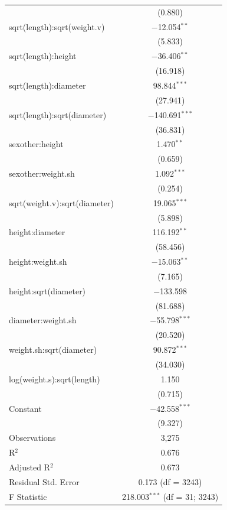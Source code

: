 \documentclass[12pt]{article}
\begin{document}
\begin{center}
\begin{longtable}{@{\extracolsep{5pt}}lc}
			& (0.880) \\[0.4ex]
			sqrt(length):sqrt(weight.v) & $-$12.054$^{**}$ \\ 
			& (5.833) \\[0.4ex]
			sqrt(length):height & $-$36.406$^{**}$ \\ 
			& (16.918) \\[0.4ex]
			sqrt(length):diameter & 98.844$^{***}$ \\ 
			& (27.941) \\[0.4ex]
			sqrt(length):sqrt(diameter) & $-$140.691$^{***}$ \\ 
			& (36.831) \\[0.4ex]
			sexother:height & 1.470$^{**}$ \\ 
			& (0.659) \\[0.4ex]
			sexother:weight.sh & 1.092$^{***}$ \\ 
			& (0.254) \\[0.4ex]
			sqrt(weight.v):sqrt(diameter) & 19.065$^{***}$ \\ 
			& (5.898) \\[0.4ex]
			height:diameter & 116.192$^{**}$ \\ 
			& (58.456) \\[0.4ex]
			height:weight.sh & $-$15.063$^{**}$ \\ 
			& (7.165) \\[0.4ex]
			height:sqrt(diameter) & $-$133.598 \\ 
			& (81.688) \\[0.4ex]
			diameter:weight.sh & $-$55.798$^{***}$ \\ 
			& (20.520) \\[0.4ex]
			weight.sh:sqrt(diameter) & 90.872$^{***}$ \\ 
			& (34.030) \\[0.4ex]
			log(weight.s):sqrt(length) & 1.150 \\ 
			& (0.715) \\[0.4ex]
			Constant       & $-$42.558$^{***}$ \\ 
			& (9.327) \\[0.4ex]
			Observations   & 3,275 \\ 
			R$^{2}$        & 0.676 \\ 
			Adjusted R$^{2}$ & 0.673 \\ 
			Residual Std. Error & 0.173 (df = 3243) \\ 
			F Statistic    & 218.003$^{***}$ (df = 31; 3243) \\ 
		\end{longtable}
	\end{center}
	
\end{document}
